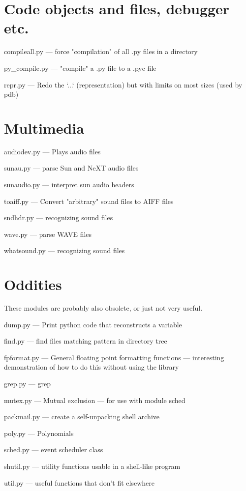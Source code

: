 \section{Code objects and files, debugger etc.}

compileall.py --- force "compilation" of all .py files in a directory

py_compile.py --- "compile" a .py file to a .pyc file

repr.py --- Redo the `...` (representation) but with limits on most
sizes (used by pdb)


\section{Multimedia}

audiodev.py --- Plays audio files

sunau.py --- parse Sun and NeXT audio files

sunaudio.py --- interpret sun audio headers

toaiff.py --- Convert "arbitrary" sound files to AIFF files

sndhdr.py --- recognizing sound files

wave.py --- parse WAVE files

whatsound.py --- recognizing sound files


\section{Oddities}

These modules are probably also obsolete, or just not very useful.

dump.py --- Print python code that reconstructs a variable

find.py --- find files matching pattern in directory tree

fpformat.py --- General floating point formatting functions ---
interesting demonstration of how to do this without using the \C{}
library

grep.py --- grep

mutex.py --- Mutual exclusion --- for use with module sched

packmail.py --- create a self-unpacking \UNIX{} shell archive

poly.py --- Polynomials

sched.py --- event scheduler class

shutil.py --- utility functions usable in a shell-like program

util.py --- useful functions that don't fit elsewhere

